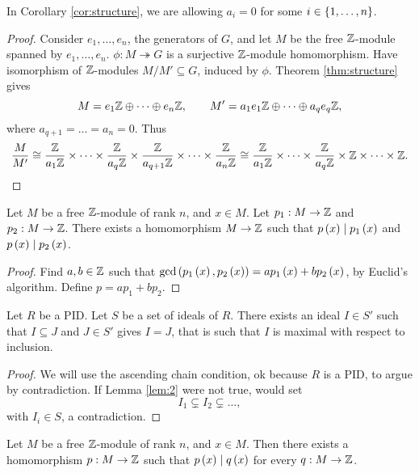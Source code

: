 
\begin{remark*}
In Corollary \ref{cor:structure}, we are allowing $ a_i = 0 $ for some $ i \in \left\{ 1, \dots, n \right\} $.
\end{remark*}

\begin{proof}
Consider $ e_1, \dots, e_n $, the generators of $ G $, and let $ M $ be the free $ \mathbb{Z} $-module spanned by $ e_1, \dots, e_n $. $ \phi : M \twoheadrightarrow G $ is a surjective $ \mathbb{Z} $-module homomorphism. Have isomorphism of $ \mathbb{Z} $-modules $ M / M' \subseteq G $, induced by $ \phi $. Theorem \ref{thm:structure} gives
$$ M = e_1\mathbb{Z} \oplus \dots \oplus e_n\mathbb{Z}, \qquad M' = a_1e_1\mathbb{Z} \oplus \dots \oplus a_qe_q\mathbb{Z}, $$
where $ a_{q + 1} = \dots = a_n = 0 $. Thus
$$ \dfrac{M}{M'} \cong \dfrac{\mathbb{Z}}{a_1\mathbb{Z}} \times \dots \times \dfrac{\mathbb{Z}}{a_q\mathbb{Z}} \times \dfrac{\mathbb{Z}}{a_{q + 1}\mathbb{Z}} \times \dots \times \dfrac{\mathbb{Z}}{a_n\mathbb{Z}} \cong \dfrac{\mathbb{Z}}{a_1\mathbb{Z}} \times \dots \times \dfrac{\mathbb{Z}}{a_q\mathbb{Z}} \times \mathbb{Z} \times \dots \times \mathbb{Z}. $$
\end{proof}

\begin{lemma}
\label{lem:1}
Let $ M $ be a free $ \mathbb{Z} $-module of rank $ n $, and $ x \in M $. Let $ p_1 : M \to \mathbb{Z} $ and $ p_2 : M \to \mathbb{Z} $. There exists a homomorphism $ M \to \mathbb{Z} $ such that $ p\left( x \right) \mid p_1\left( x \right) $ and $ p\left( x \right) \mid p_2\left( x \right) $.
\end{lemma}

\begin{proof}
Find $ a, b \in \mathbb{Z} $ such that $ \gcd\left( p_1\left( x \right), p_2\left( x \right) \right) = ap_1\left( x \right) + bp_2\left( x \right) $, by Euclid's algorithm. Define $ p = ap_1 + bp_2 $.
\end{proof}

\begin{lemma}
\label{lem:2}
Let $ R $ be a PID. Let $ S $ be a set of ideals of $ R $. There exists an ideal $ I \in S' $ such that $ I \subseteq J $ and $ J \in S' $ gives $ I = J $, that is such that $ I $ is maximal with respect to inclusion.
\end{lemma}

\begin{proof}
We will use the ascending chain condition, ok because $ R $ is a PID, to argue by contradiction. If Lemma \ref{lem:2} were not true, would set
$$ I_1 \subsetneq I_2 \subsetneq \dots, $$
with $ I_i \in S $, a contradiction.
\end{proof}

\begin{lemma}
\label{lem:3}
Let $ M $ be a free $ \mathbb{Z} $-module of rank $ n $, and $ x \in M $. Then there exists a homomorphism $ p : M \to \mathbb{Z} $ such that $ p\left( x \right) \mid q\left( x \right) $ for every $ q : M \to \mathbb{Z} $.
\end{lemma}

